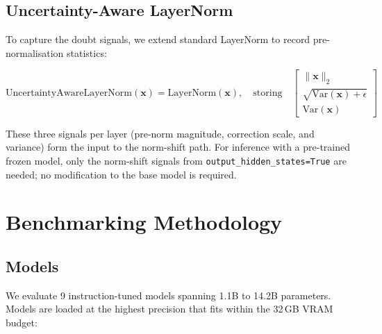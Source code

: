 \documentclass[11pt,a4paper]{article}
\begin{document}
\subsection{Uncertainty-Aware LayerNorm}

To capture the doubt signals, we extend standard LayerNorm to record
pre-normalisation statistics:

\begin{equation}
  \text{UncertaintyAwareLayerNorm}(\mathbf{x}) = \text{LayerNorm}(\mathbf{x}),
  \quad \text{storing} \quad
  \begin{bmatrix}
    \|\mathbf{x}\|_{2} \\
    \sqrt{\text{Var}(\mathbf{x}) + \epsilon} \\
    \text{Var}(\mathbf{x})
  \end{bmatrix}
\end{equation}

These three signals per layer (pre-norm magnitude, correction scale,
and variance) form the input to the norm-shift path.  For inference
with a pre-trained frozen model, only the norm-shift signals from
\texttt{output\_hidden\_states=True} are needed; no modification to the
base model is required.


\section{Benchmarking Methodology}
\label{sec:methodology}

\subsection{Models}

We evaluate 9 instruction-tuned models spanning 1.1B to 14.2B parameters.
Models are loaded at the highest precision that fits within the 32\,GB
VRAM budget:
\end{document}
